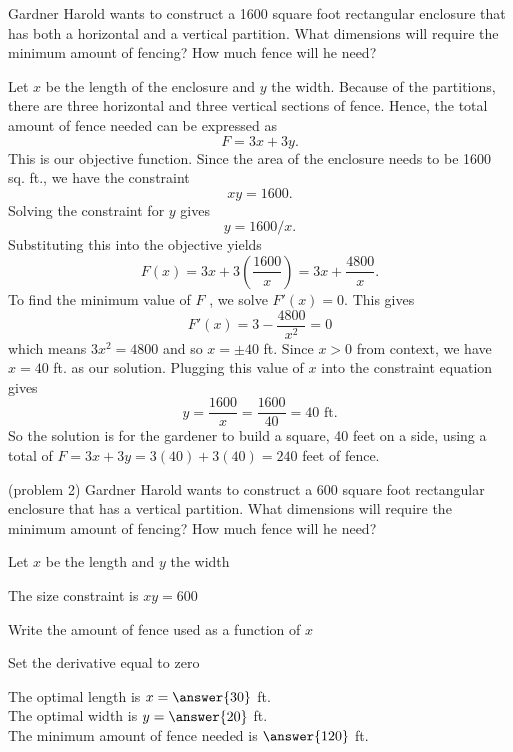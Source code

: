 \documentclass[handout]{ximera}
\begin{document}
\begin{example}[example 2]
Gardner Harold wants to construct a 1600 square foot  rectangular enclosure that has both a 
horizontal and a vertical partition. What dimensions will require the minimum amount of fencing?  
How much fence will he need?

\begin{center}
\end{center}

Let $x$ be the length of the enclosure and $y$ the width. Because of the partitions, there 
are three horizontal and three vertical sections of fence. Hence, the total amount of fence needed can be expressed as 
\[F = 3x + 3y.\]
 This is our objective function. Since the area of the enclosure needs to be 1600 sq. ft., we have the constraint 
\[xy = 1600.\]
Solving the constraint for $y$ gives 
\[
y = 1600/x.
\]
  Substituting this into the objective yields
\[F(x) = 3x + 3\left(\frac{1600}{x}\right) = 3x + \frac{4800}{x}.\]
To find the minimum value of $F$ , we solve $F'(x) = 0$. This gives
\[F'(x) = 3 - \frac{4800}{x^2} = 0\]
which means $3x^2 = 4800$ and so $x = \pm 40$ ft.  Since $x>0$ from context, we have $x = 40$ ft. as our solution.
Plugging this value of $x$ into the constraint equation gives
\[y = \frac{1600}{x} = \frac{1600}{40} = 40 \mbox{ ft.}\]
So the solution is for the gardener to build a square, 40 feet on a side, using a total of $F = 3x+ 3y = 3(40) + 3(40)
= 240$ feet of fence.
\end{example}

\begin{problem}(problem 2)
Gardner Harold wants to construct a 600 square foot  rectangular enclosure that has a 
vertical partition. What dimensions will require the minimum amount of fencing?  
How much fence will he need?

\begin{hint}
Let $x$ be the length and $y$ the width
\end{hint}
\begin{hint}
The size constraint is $xy = 600$
\end{hint}
\begin{hint}
Write the amount of fence used as a function of $x$
\end{hint}
\begin{hint}
Set the derivative equal to zero
\end{hint}

The optimal length is $x= \answer{30}$ ft.\\
The optimal width is $y = \answer{20}$ ft.\\
The minimum amount of fence needed is $\answer{120}$ ft.
\end{problem}
\end{document}
